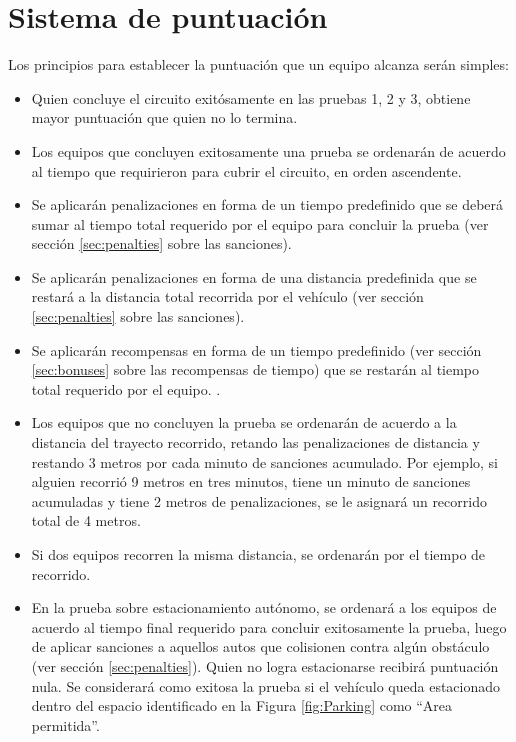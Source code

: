 \documentclass[letterpaper,12pt]{article}
\begin{document}
\section{Sistema de puntuación}
Los principios para establecer la puntuación que un equipo alcanza serán simples:
\begin{itemize}
\item Quien concluye el circuito exitósamente en las pruebas 1, 2 y 3, obtiene mayor puntuación que quien no lo termina.
\item Los equipos que concluyen exitosamente una prueba se ordenarán de acuerdo al tiempo que requirieron para cubrir el circuito, en orden ascendente.
\item Se aplicarán penalizaciones en forma de un tiempo predefinido que se deberá sumar al tiempo total requerido por el equipo para concluir la prueba (ver sección \ref{sec:penalties} sobre las sanciones).
\item Se aplicarán penalizaciones en forma de una distancia predefinida que se restará a la distancia total recorrida por el vehículo (ver sección \ref{sec:penalties} sobre las sanciones).
\item Se aplicarán recompensas en forma de un tiempo predefinido (ver sección \ref{sec:bonuses} sobre las recompensas de tiempo) que se restarán al tiempo total requerido por el equipo. .
\item Los equipos que no concluyen la prueba se ordenarán de acuerdo a la distancia del trayecto recorrido, retando las penalizaciones de distancia y restando 3 metros por cada minuto de sanciones acumulado. Por ejemplo, si alguien recorrió 9 metros en tres minutos, tiene un minuto de sanciones acumuladas y tiene 2 metros de penalizaciones, se le asignará un recorrido total de 4 metros.
\item Si dos equipos recorren la misma distancia, se ordenarán por el tiempo de recorrido.
\item En la prueba sobre estacionamiento autónomo, se ordenará a los equipos de acuerdo al tiempo final requerido para concluir exitosamente la prueba, luego de aplicar sanciones a aquellos autos que colisionen contra algún obstáculo (ver sección \ref{sec:penalties}). Quien no logra estacionarse recibirá puntuación nula. Se considerará como exitosa la prueba si el vehículo queda estacionado dentro del espacio identificado en la Figura \ref{fig:Parking} como “Area permitida”.
\end{itemize}
\end{document}
